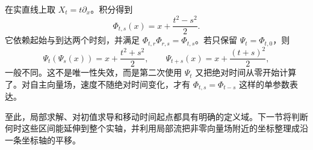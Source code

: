 \begin{example}
	\label{g1:exm:time-dependent-translation}
	在实直线上取 \(X_t=t\partial_x\)。积分得到
	\[
		\Phi_{t,s}(x)=x+\frac{t^2-s^2}{2}.
	\]
	它依赖起始与到达两个时刻，并满足 \(\Phi_{t,r}\Phi_{r,s}=\Phi_{t,s}\)。若只保留 \(\Psi_t=\Phi_{t,0}\)，则
	\[
		\Psi_t(\Psi_s(x))=x+\frac{t^2+s^2}{2},\qquad
		\Psi_{t+s}(x)=x+\frac{(t+s)^2}{2},
	\]
	一般不同。这不是唯一性失效，而是第二次使用 \(\Psi_t\) 又把绝对时间从零开始计算了。对自主向量场，速度不随绝对时间变化，才有 \(\Phi_{t,s}=\Phi_{t-s}\) 这样的单参数表达。
\end{example}

至此，局部求解、对初值求导和移动时间起点都具有明确的定义域。下一节将判断何时这些区间能延伸到整个实轴，并利用局部流把非零向量场附近的坐标整理成沿一条坐标轴的平移。
